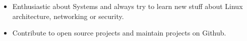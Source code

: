 



{\fontsize{11pt}{1em}\bodyfontlight\upshape\color{text}
\begin{itemize}
  \itemsep-0.3em
  \item Enthusiastic about Systems and always try to learn new stuff about Linux architecture, networking or security.
  \item Contribute to open source projects and maintain projects on Github.
\end{itemize}
}
